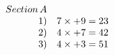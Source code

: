 \documentclass[preview]{standalone}
\begin{document}
\begin{align*}
\begin{array}{r l}{S e c t i o n\,A}\\ {1)}&{{}7\times+9=23}\\ {2)}&{{}4\times+7=42}\\ {3)}&{{}4\times+3=51}\end{array}
\end{align*}
\end{document}

